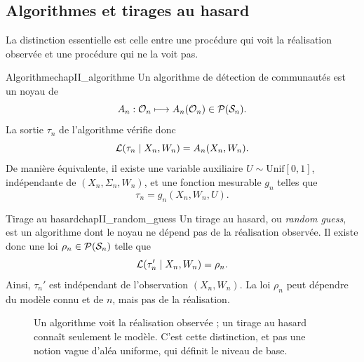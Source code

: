 \subsection{Algorithmes et tirages au hasard}

La distinction essentielle est celle entre une procédure qui voit la réalisation observée et une procédure qui ne la voit pas.

\begin{Definition}{Algorithme}{chapII_algorithme}
Un algorithme de détection de communautés est un noyau de 
\[
    A_n:\mathcal O_n\longmapsto A_n(\mathcal O_n)\in\mathcal P(\mathcal S_n).
\]
La sortie $\tau_n$ de l'algorithme vérifie donc
\[
    \mathcal L(\tau_n\mid X_n,W_n)=A_n(X_n,W_n).
\]
De manière équivalente, il existe une variable auxiliaire $U\sim\mathrm{Unif}[0,1]$, indépendante de $(X_n,\Sigma_n,W_n)$, et une fonction mesurable $g_n$ telles que
\[
    \tau_n=g_n(X_n,W_n,U).
\]
\end{Definition}

\begin{Definition}{Tirage au hasard}{chapII_random_guess}
Un tirage au hasard, ou \emph{random guess}, est un algorithme dont le noyau ne dépend pas de la réalisation observée. Il existe donc une loi $\rho_n\in\mathcal P(\mathcal S_n)$ telle que
\[
    \mathcal L(\tau_n'\mid X_n,W_n)=\rho_n.
\]
Ainsi, $\tau_n'$ est indépendant de l'observation $(X_n,W_n)$. La loi $\rho_n$ peut dépendre du modèle connu et de $n$, mais pas de la réalisation.
\end{Definition}

\begin{figure}[H]
\centering
{}
\caption{Un algorithme voit la réalisation observée ; un tirage au hasard connaît seulement le modèle. C'est cette distinction, et pas une notion vague d'aléa uniforme, qui définit le niveau de base.}
\label{fig:chapII_algo_vs_guess}
\end{figure}

